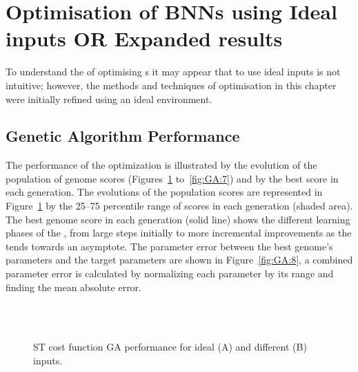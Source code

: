 \section{Optimisation of {BNN}s using Ideal inputs \textbf{OR} Expanded results}

To understand the of optimising {\BNN}s it may appear that to use ideal
inputs is not intuitive; however, the methods and techniques of {\GA}
optimisation in this chapter were initially refined using an ideal
environment.



\subsection{Genetic Algorithm Performance}



The performance of the {\GA} optimization is illustrated by the evolution
of the population of genome scores (Figures~\ref{fig:GA:5}
to~\ref{fig:GA:7}) and by the best score in each generation. The
evolutions of the population scores are represented in
Figure~\ref{fig:GA:5} by the 25--75 percentile range of scores in each
generation (shaded area). The best genome score in each generation
(solid line) shows the different learning phases of the {\GA}, from large
steps initially to more incremental improvements as the {\GA} tends
towards an asymptote. The parameter error between the best genome's
parameters and the target parameters are shown in Figure~\ref{fig:GA:8},
a combined parameter error is calculated by normalizing each parameter
by its range and finding the mean absolute error.

\smallskip{}

\begin{figure}[htb]
\centering
{}\hspace{2.2in} \hfill \\
\hfill\\
 \caption{ST cost function {GA} performance for ideal (A) and different (B) inputs.}\label{fig:GA:5}
\end{figure}


